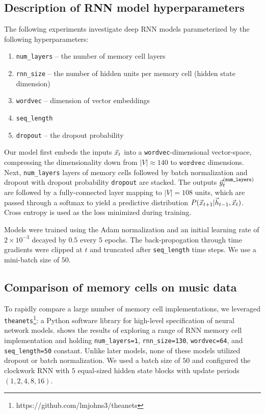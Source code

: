 \subsection{Description of RNN model hyperparameters}

The following experiments investigate deep RNN models parameterized by the
following hyperparameters:
\begin{enumerate}
  \item \texttt{num\_layers} -- the number of memory cell layers
  \item \texttt{rnn\_size} -- the number of hidden units per memory cell (\ie hidden state dimension)
  \item \texttt{wordvec} -- dimension of vector embeddings
  \item \texttt{seq\_length}
  \item \texttt{dropout} -- the dropout probability
\end{enumerate}


Our model first embeds the inputs $\vec{x}_t$ into a \texttt{wordvec}-dimensional
vector-space, compressing the dimensionality down from $|V| \approx 140$ to
$\texttt{wordvec}$ dimensions. Next, \texttt{num\_layers} layers of memory
cells followed by batch normalization \citep{ioffe2015batch} and dropout
\citep{hinton2012improving} with dropout probability \texttt{dropout} are
stacked. The outputs $\vec{y}^{(\texttt{num\_layers})}_t$ are followed by a
fully-connected layer mapping to $|V| = 108$ units, which are passed through a
softmax to yield a predictive distribution $P(\vec{x}_{t+1} | \vec{h}_{t-1}, \vec{x}_{t})$.
Cross entropy is used as the loss minimized during training.

Models were trained using the Adam normalization \citep{kingma2014adam}
and an initial learning rate of $2 \times 10^{-3}$ decayed by $0.5$ every $5$
epochs. The back-propogation through time gradients were clipped
at $t$\citep{Pascanu2012} and truncated after \texttt{seq\_length} time steps.
We use a mini-batch size of $50$.


\subsection{Comparison of memory cells on music data}

To rapidly compare a large number of memory cell implementations, we leveraged
\texttt{theanets}\footnote{https://github.com/lmjohns3/theanets}: a Python
software library for high-level specification of neural network models.
 shows the results of exploring a range of RNN
memory cell implementation and holding \texttt{num\_layers=1},
\texttt{rnn\_size=130}, \texttt{wordvec=64}, and \texttt{seq\_length=50}
constant. Unlike later models, none of these models utilized dropout or batch
normalization. We used a batch size of $50$ and configured the clockwork RNN
\citep{cho2014learning} with $5$ equal-sized hidden state blocks with update
periods $(1, 2, 4, 8, 16)$.

